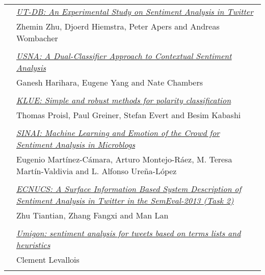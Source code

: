\begin{tabular}{p{20mm}p{138mm}}
 & \hyperlink{page.384}{\em UT-DB: An Experimental Study on Sentiment Analysis in Twitter}\\
         & Zhemin Zhu, Djoerd Hiemstra, Peter Apers and Andreas Wombacher \\
\\

 & \hyperlink{page.390}{\em USNA: A Dual-Classifier Approach to Contextual Sentiment Analysis}\\
         & Ganesh Harihara, Eugene Yang and Nate Chambers \\
\\

 & \hyperlink{page.395}{\em KLUE: Simple and robust methods for polarity classification}\\
         & Thomas Proisl, Paul Greiner, Stefan Evert and Besim Kabashi \\
\\

 & \hyperlink{page.402}{\em SINAI: Machine Learning and Emotion of the Crowd for Sentiment Analysis in Microblogs}\\
         & Eugenio Mart\'{i}nez-C\'{a}mara, Arturo Montejo-R\'{a}ez, M. Teresa Mart\'{i}n-Valdivia and L. Alfonso Ure\~{n}a-L\'{o}pez \\
\\

 & \hyperlink{page.408}{\em ECNUCS: A Surface Information Based System Description of Sentiment Analysis in Twitter in the SemEval-2013 (Task 2)}\\
         & Zhu Tiantian, Zhang Fangxi and Man Lan \\
\\

 & \hyperlink{page.414}{\em Umigon: sentiment analysis for tweets based on terms lists and heuristics}\\
         & Clement Levallois \\
\\


\end{tabular}
\newpage
